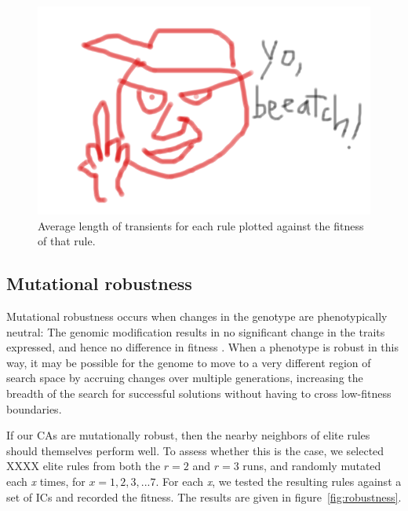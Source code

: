 \begin{figure}
\begin{center}
\includegraphics[width=\linewidth]{foo.png}
\caption{Average length of transients for each rule plotted against the fitness of that rule.}
\label{fig:transients}
\end{center}
\end{figure}

\subsection{Mutational robustness} \label{sec:2_2}

Mutational robustness occurs when changes in the genotype are phenotypically neutral: The genomic modification results in no significant change 
in the traits expressed, and hence no difference in fitness \cite{wagner_role_2012}. When a phenotype is robust in this way, it may be possible for the 
genome to move to a very different region of search space by accruing changes over multiple generations, increasing the breadth of the search for 
successful solutions without having to cross low-fitness boundaries.

If our CAs are mutationally robust, then the nearby neighbors of elite rules should themselves perform well. To assess whether 
this is the case, we selected XXXX elite rules from both the $r = 2$ and $r = 3$ runs, and randomly mutated each \textit{x} times, for $x = 1,2,3, ... 7$. 
For each \textit{x}, we tested the resulting rules against a set of ICs and recorded the fitness. The results are given in figure~\ref{fig:robustness}.


